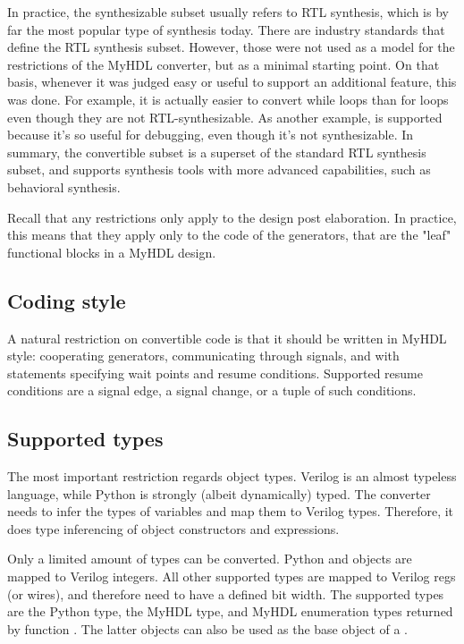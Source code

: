 In practice, the synthesizable subset usually refers to RTL synthesis,
which is by far the most popular type of synthesis today. There are
industry standards that define the RTL synthesis subset.  However,
those were not used as a model for the restrictions of the MyHDL
converter, but as a minimal starting point.  On that basis, whenever
it was judged easy or useful to support an additional feature, this
was done. For example, it is actually easier to convert while loops
than for loops even though they are not RTL-synthesizable.  As another
example,  is supported because it's so useful for
debugging, even though it's not synthesizable.  In summary, the
convertible subset is a superset of the standard RTL synthesis subset,
and supports synthesis tools with more advanced capabilities, such as
behavioral synthesis.

Recall that any restrictions only apply to the design post
elaboration.  In practice, this means that they apply only to the code
of the generators, that are the "leaf" functional blocks in a MyHDL
design.

\subsection{Coding style\label{conv-subset-style}}

A natural restriction on convertible code is that it should be
written in MyHDL style: cooperating generators, communicating through
signals, and with  statements specifying wait points and resume
conditions.  Supported resume conditions are a signal edge, a signal
change, or a tuple of such conditions.

\subsection{Supported types\label{conv-subset-types}}

The most important restriction regards object types. Verilog is an
almost typeless language, while Python is strongly (albeit
dynamically) typed. The converter needs to infer the types of
variables and map them to Verilog types. Therefore, it does type
inferencing of object constructors and expressions.

Only a limited amount of types can be converted.
Python  and  objects are mapped to Verilog
integers. All other supported types are mapped to Verilog regs (or
wires), and therefore need to have a defined bit width. The supported
types are the Python  type, the MyHDL  type,
and MyHDL enumeration types returned by function . The
latter objects can also be used as the base object of a
. 


